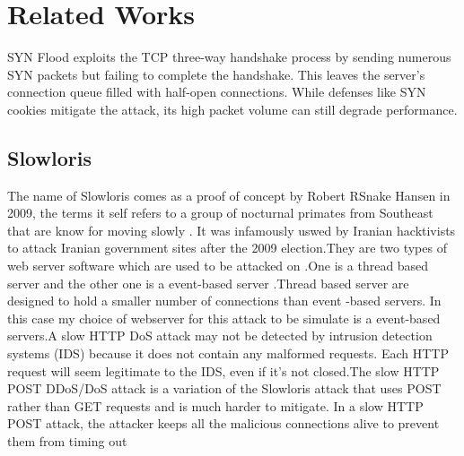 \documentclass[conference]{IEEEtran}
\begin{document}
\section{Related Works}
SYN Flood exploits the TCP three-way handshake process by sending numerous SYN packets but failing to complete the handshake. This leaves the server’s connection queue filled with half-open connections. While defenses like SYN cookies mitigate the attack, its high packet volume can still degrade performance.
\subsection{Slowloris}
The name of Slowloris comes  as a proof of concept by Robert RSnake Hansen in 2009, the terms it self refers to a group of nocturnal primates from Southeast  that are know for moving slowly . It was infamously uswed by Iranian hacktivists to attack Iranian government sites after the 2009 election.They  are two types of web server software which are used to be attacked on .One is a thread based server  and the other one is a event-based server .Thread based server are designed to hold a smaller number of connections than event -based servers. In this case my choice of webserver for this attack to be simulate is a  event-based servers.A slow HTTP DoS attack may not be detected by intrusion detection systems (IDS) because it does not contain any malformed requests. Each HTTP request will seem legitimate to the IDS, even if it’s not closed.The slow HTTP POST DDoS/DoS attack is a variation of the Slowloris attack that uses POST rather than GET requests and is much harder to mitigate. In a slow HTTP POST attack, the attacker keeps all the malicious connections alive to prevent them from timing out
\end{document}
